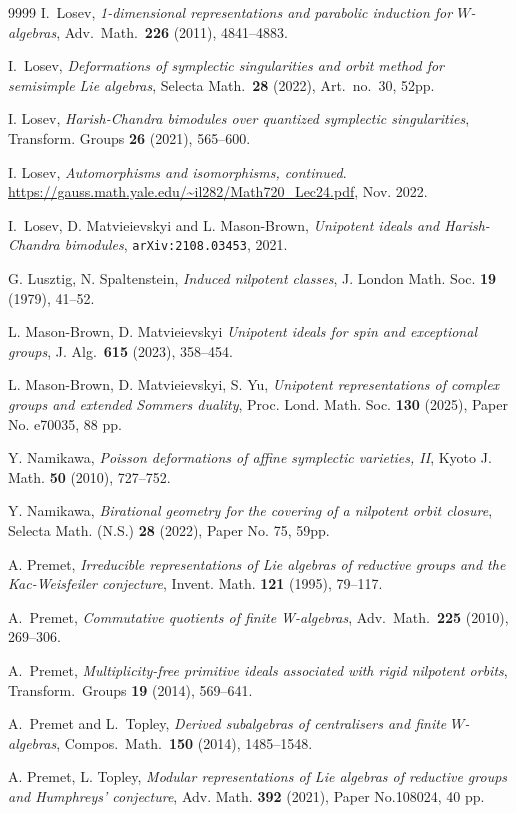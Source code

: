 \documentclass[11pt]{amsart}
\newcommand{\arxiv}[1]{{\tt arXiv:#1}}
\numberwithin{equation}{section}
\begin{document}
\begin{thebibliography}{9999}
		 I.~Losev,
		{\em 1-dimensional representations and parabolic induction for $W$-algebras},
		Adv.\ Math.\ {\bf 226} (2011), 4841--4883.
		
		 I.~Losev,
		{\em Deformations of symplectic singularities and orbit method for semisimple Lie algebras},
		Selecta Math.\ {\bf 28} (2022), Art.\ no.\ 30, 52pp.
		
		 I. Losev, {\em Harish-Chandra bimodules over quantized symplectic singularities}, Transform. Groups {\bf 26} (2021), 565--600.
		
		 I. Losev, {\em Automorphisms and isomorphisms, continued}. \url{https://gauss.math.yale.edu/~il282/Math720_Lec24.pdf}, Nov. 2022.
		
		 I.~Losev, D. Matvieievskyi and L. Mason-Brown,
		{\em Unipotent ideals and Harish-Chandra bimodules}, \arxiv{2108.03453}, 2021.
		
		 G. Lusztig, N. Spaltenstein, {\em Induced nilpotent classes}, J. London Math. Soc. {\bf 19} (1979), 41--52.
		
		 L. Mason-Brown, D. Matvieievskyi
		{\em Unipotent ideals for spin and exceptional groups}, J. Alg.\ {\bf 615} (2023), 358--454.
		
		 L. Mason-Brown, D. Matvieievskyi, S. Yu,
		{\em Unipotent representations of complex groups and extended Sommers duality}, Proc. Lond. Math. Soc. {\bf 130} (2025), Paper No. e70035, 88 pp.
		
		 Y. Namikawa, {\em Poisson deformations of affine symplectic varieties, II}, Kyoto J. Math. {\bf 50} (2010), 727--752.
		
		 Y. Namikawa, {\em Birational geometry for the covering of a nilpotent orbit closure}, Selecta Math. (N.S.) {\bf 28} (2022), Paper No. 75, 59pp.
		
		 A. Premet, {\em Irreducible representations of Lie algebras of reductive groups and the Kac-Weisfeiler conjecture}, Invent. Math. {\bf 121} (1995), 79--117.
		
		 A.~Premet,
		{\em Commutative quotients of finite W-algebras},
		Adv.\ Math.\ {\bf 225} (2010), 269--306.
		
		 A.~Premet,
		{\em Multiplicity-free primitive ideals associated with rigid nilpotent orbits},
		Transform.\ Groups {\bf 19} (2014), 569--641.
		
		 A.~Premet and L.~Topley,
		{\em Derived subalgebras of centralisers and finite $W$-algebras},
		Compos.\ Math.\ {\bf 150} (2014), 1485--1548.
		
		 A. Premet, L. Topley, {\em Modular representations of Lie algebras of reductive groups and Humphreys' conjecture}, Adv. Math. {\bf 392} (2021), Paper No.108024, 40 pp.
		
	\end{thebibliography}
	
\end{document}
